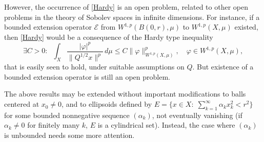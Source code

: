 \documentclass[reqno,twoside,12pt]{amsart}
\begin{document}
However, the occurrence of \eqref{Hardy} is an open problem, related to other open problems in the theory of Sobolev spaces in infinite dimensions. For instance, if a bounded  extension operator ${\mathcal E }$ from $W^{1,p}(B(0,r), \mu)$ to $W^{1,p}(X, \mu)$ existed, then  \eqref{Hardy}  would be a consequence of the Hardy type inequality
\begin{equation}
\label{HardyX}
\exists C>0:\;\;\int_{X}\frac{|\varphi|^p}{\|Q^{1/2}x\|^p}\,d\mu \leq C\|\varphi\|_{W^{1,p}(X, \mu)}^p, \quad \varphi \in W^{1,p}(X, \mu), 
\end{equation}
that is easily seen to hold, under suitable assumptions on $Q$. But existence of a bounded extension operator is still an open problem. 

\vspace{3mm}

The above results may be extended without important modifications to balls centered at $x_0\neq 0$, and to ellipsoids defined by $E = \{ x\in X:\; \sum_{k=1}^{\infty}\alpha_k x_k^2 <r^2\}$ for some bounded nonnegative  sequence $(\alpha_k)$, not eventually vanishing (if $\alpha_k\neq 0$ for finitely many $k$, $E$ is a cylindrical set). Instead, the case where $(\alpha_k)$ is unbounded needs some more attention. 
 
 
 
\end{document}
